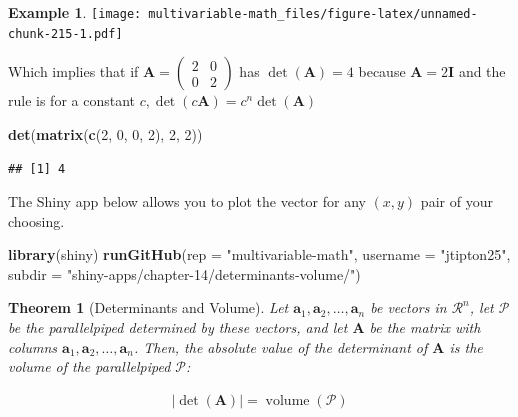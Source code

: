 \documentclass[
]{book}
\newenvironment{Shaded}{\begin{snugshade}}{\end{snugshade}}
\newcommand{\DataTypeTok}[1]{\textcolor[rgb]{0.13,0.29,0.53}{#1}}
\newcommand{\DecValTok}[1]{\textcolor[rgb]{0.00,0.00,0.81}{#1}}
\newcommand{\KeywordTok}[1]{\textcolor[rgb]{0.13,0.29,0.53}{\textbf{#1}}}
\newcommand{\NormalTok}[1]{#1}
\newcommand{\StringTok}[1]{\textcolor[rgb]{0.31,0.60,0.02}{#1}}
\newtheorem{theorem}{Theorem}[chapter]
\theoremstyle{definition}
\theoremstyle{definition}
\newtheorem{example}{Example}[chapter]
\theoremstyle{definition}
\theoremstyle{remark}
\begin{document}
\begin{example}
\texttt{[image: multivariable-math\_files/figure-latex/unnamed-chunk-215-1.pdf]}

Which implies that if \(\mathbf{A} = \begin{pmatrix} 2 & 0 \\ 0 & 2 \end{pmatrix}\) has \(\det(\mathbf{A}) = 4\) because \(\mathbf{A} = 2 \mathbf{I}\) and the rule is for a constant \(c, \det(c\mathbf{A}) = c^n \det(\mathbf{A})\)

\begin{Shaded}
\begin{Highlighting}[]
\KeywordTok{det}\NormalTok{(}\KeywordTok{matrix}\NormalTok{(}\KeywordTok{c}\NormalTok{(}\DecValTok{2}\NormalTok{, }\DecValTok{0}\NormalTok{, }\DecValTok{0}\NormalTok{, }\DecValTok{2}\NormalTok{), }\DecValTok{2}\NormalTok{, }\DecValTok{2}\NormalTok{))}
\end{Highlighting}
\end{Shaded}

\begin{verbatim}
## [1] 4
\end{verbatim}

\end{example}

The Shiny app below allows you to plot the vector for any \((x, y)\) pair of your choosing.

\begin{Shaded}
\begin{Highlighting}[]
\KeywordTok{library}\NormalTok{(shiny)}
\KeywordTok{runGitHub}\NormalTok{(}\DataTypeTok{rep =} \StringTok{"multivariable-math"}\NormalTok{, }\DataTypeTok{username =} \StringTok{"jtipton25"}\NormalTok{, }\DataTypeTok{subdir =} \StringTok{"shiny-apps/chapter-14/determinants-volume/"}\NormalTok{) }
\end{Highlighting}
\end{Shaded}

\begin{theorem}[Determinants and Volume]
\protect\hypertarget{thm:unnamed-chunk-218}{}{\label{thm:unnamed-chunk-218} {} }Let \(\mathbf{a}_1, \mathbf{a}_2, \ldots, \mathbf{a}_n\) be vectors in \(\mathcal{R}^n\), let \(\mathcal{P}\) be the parallelpiped determined by these vectors, and let \(\mathbf{A}\) be the matrix with columns \(\mathbf{a}_1, \mathbf{a}_2, \ldots, \mathbf{a}_n\). Then, the absolute value of the determinant of \(\mathbf{A}\) is the volume of the parallelpiped \(\mathcal{P}\):

\[
\begin{aligned}
|\det(\mathbf{A})| = \operatorname{volume}(\mathcal{P})
\end{aligned}
\]
\end{theorem}
\end{document}
